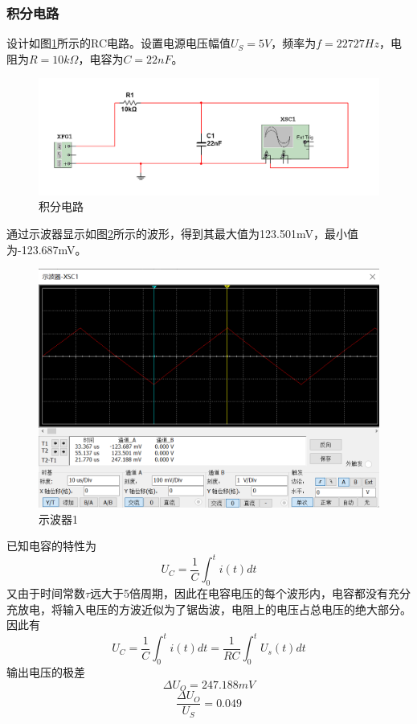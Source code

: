 \documentclass{ctexart}
\begin{document}
\subsubsection{积分电路}
设计如图\ref{fig:积分电路}所示的RC电路。设置电源电压幅值$U_S=5V$，频率为$f=22727Hz$，电阻为$R=10k\Omega$，电容为$C=22nF$。
\begin{figure}[!ht]
    \centering
    \includegraphics[scale=0.5]{pic/积分电路.png}
    \caption{积分电路}
    \label{fig:积分电路}
\end{figure}
通过示波器显示如图\ref{fig:示波器1}所示的波形，得到其最大值为123.501mV，最小值为-123.687mV。
\begin{figure}
    \centering
    \includegraphics[scale=0.8]{pic/示波器1.png}
    \caption{示波器1}
    \label{fig:示波器1}
\end{figure}
已知电容的特性为
\begin{equation}
    U_C=\dfrac{1}{C}\int_0^t i(t)dt
\end{equation}
又由于时间常数$\tau$远大于5倍周期，因此在电容电压的每个波形内，电容都没有充分充放电，将输入电压的方波近似为了锯齿波，电阻上的电压占总电压的绝大部分。因此有
\begin{equation}
    U_C=\dfrac{1}{C}\int_0^t i(t)dt =\dfrac{1}{RC}\int _0^t U_s(t)dt
\end{equation}
输出电压的极差
\begin{equation}
    \Delta U_O = 247.188mV 
\end{equation}
\begin{equation}
    \dfrac{\Delta U_O}{U_S}=0.049
\end{equation}
\end{document}
